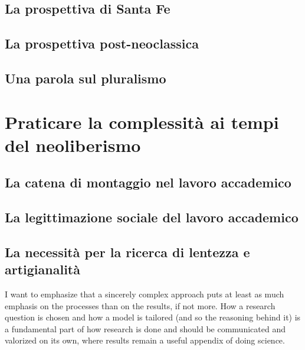 \documentclass[a4paper, headings=standardclasses]{scrartcl}
\begin{document}
\subsection{La prospettiva di Santa Fe}

\subsection{La prospettiva post-neoclassica}

\subsection{Una parola sul pluralismo}

\section{Praticare la complessità ai tempi del neoliberismo}
\subsection{La catena di montaggio nel lavoro accademico}

\subsection{La legittimazione sociale del lavoro accademico}

\subsection{La necessità per la ricerca di lentezza e artigianalità}
I want to emphasize that a sincerely complex approach puts at least as much emphasis on the processes than on the results, if not more. How a research question is chosen and how a model is tailored (and so the reasoning behind it) is a fundamental part of how research is done and should be communicated and valorized on its own, where results remain a useful appendix of doing science.


\printbibliography
\end{document}
